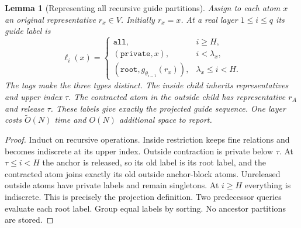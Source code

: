\documentclass[11pt]{article}
\newtheorem{lemma}[theorem]{Lemma}
\theoremstyle{definition}
\newcommand{\wt}{\widetilde}
\begin{document}
\begin{lemma}[Representing all recursive guide partitions]\label{lem:reps}
Assign to each atom $x$ an original representative $r_x\in V$.
Initially $r_x=x$. At a real layer $1\le i\le q$ its guide label is
\[
 \ell_i(x)=
 \begin{cases}
  \mathtt{all},&i\ge H,\\
  (\mathtt{private},x),&i<\lambda_x,\\
  (\mathtt{root},g_{\theta_{i-1}}(r_x)),&\lambda_x\le i<H.
 \end{cases}
\]
The tags make the three types distinct. The inside child inherits
representatives and upper index $\tau$. The contracted atom in the
outside child has representative $r_A$ and release $\tau$.
These labels give exactly the projected guide sequence.
One layer costs $\wt O(N)$ time and $O(N)$ additional space to report.
\end{lemma}
\begin{proof}
Induct on recursive operations. Inside restriction keeps fine relations
and becomes indiscrete at its upper index. Outside contraction is private
below $\tau$. At $\tau\le i<H$ the anchor is released, so its old label is
its root label, and the contracted atom joins exactly its old outside
anchor-block atoms. Unreleased outside atoms have private labels and remain
singletons. At $i\ge H$ everything is indiscrete. This is precisely
the projection definition. Two predecessor queries evaluate each root
label. Group equal labels by sorting. No ancestor partitions are stored.
\end{proof}
\end{document}
